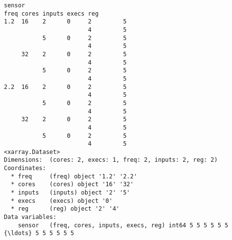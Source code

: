 \documentclass[11pt]{article}
\begin{document}
    \begin{Verbatim}[commandchars=\\\{\}]
                             sensor
freq cores inputs execs reg
1.2  16    2      0     2         5
                        4         5
           5      0     2         5
                        4         5
     32    2      0     2         5
                        4         5
           5      0     2         5
                        4         5
2.2  16    2      0     2         5
                        4         5
           5      0     2         5
                        4         5
     32    2      0     2         5
                        4         5
           5      0     2         5
                        4         5
<xarray.Dataset>
Dimensions:  (cores: 2, execs: 1, freq: 2, inputs: 2, reg: 2)
Coordinates:
  * freq     (freq) object '1.2' '2.2'
  * cores    (cores) object '16' '32'
  * inputs   (inputs) object '2' '5'
  * execs    (execs) object '0'
  * reg      (reg) object '2' '4'
Data variables:
    sensor   (freq, cores, inputs, execs, reg) int64 5 5 5 5 5 5 {\ldots} 5 5 5 5 5 5
    \end{Verbatim}
\end{document}

